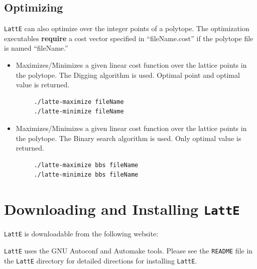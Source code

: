 \documentclass{article}
\newcommand{\latte}{{\tt LattE}\xspace}
\begin{document}
\subsection{Optimizing}


\latte can also optimize over the integer points of a polytope. The optimization executables {\bf require} a cost vector specified in ``fileName.cost'' if the polytope file is named ``fileName.''

\begin{itemize}
\item Maximizes/Minimizes a given linear cost function over the lattice
  points in the polytope. The Digging algorithm
  \cite{latte3} is used. Optimal point and optimal value is returned. 
\begin{verbatim}
     ./latte-maximize fileName
     ./latte-minimize fileName
\end{verbatim} 
\item Maximizes/Minimizes a given linear cost function over the lattice
  points in the polytope. The Binary search
  algorithm is used. Only optimal value is returned. 
\begin{verbatim}
     ./latte-maximize bbs fileName
     ./latte-minimize bbs fileName
\end{verbatim} 
\end{itemize}




\section{Downloading and Installing {\tt LattE}}

{\tt LattE} is downloadable from the following website:




\latte uses the GNU Autoconf and Automake tools. Please see the {\tt README} file in the \latte directory for detailed directions for installing \latte.
\end{document}
